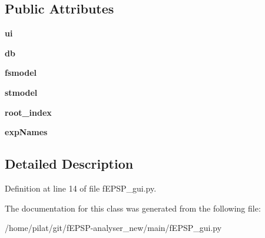\subsection*{Public Attributes}
\begin{DoxyCompactItemize}
\item 
\hypertarget{classmain_1_1f_e_p_s_p__gui_1_1_my_form_ae000576874bd1884d94977df1d4fe0fc}{{\bfseries ui}}\label{classmain_1_1f_e_p_s_p__gui_1_1_my_form_ae000576874bd1884d94977df1d4fe0fc}

\item 
\hypertarget{classmain_1_1f_e_p_s_p__gui_1_1_my_form_abbce31a8ac2252192befed1d36459394}{{\bfseries db}}\label{classmain_1_1f_e_p_s_p__gui_1_1_my_form_abbce31a8ac2252192befed1d36459394}

\item 
\hypertarget{classmain_1_1f_e_p_s_p__gui_1_1_my_form_a74b5f9410d5c3a4e49323dd1102119e3}{{\bfseries fsmodel}}\label{classmain_1_1f_e_p_s_p__gui_1_1_my_form_a74b5f9410d5c3a4e49323dd1102119e3}

\item 
\hypertarget{classmain_1_1f_e_p_s_p__gui_1_1_my_form_a642549daead2b7fe2c3838e2f4afb40d}{{\bfseries stmodel}}\label{classmain_1_1f_e_p_s_p__gui_1_1_my_form_a642549daead2b7fe2c3838e2f4afb40d}

\item 
\hypertarget{classmain_1_1f_e_p_s_p__gui_1_1_my_form_a4995db7c3a759b091ad478e3ea3e3be4}{{\bfseries root\-\_\-index}}\label{classmain_1_1f_e_p_s_p__gui_1_1_my_form_a4995db7c3a759b091ad478e3ea3e3be4}

\item 
\hypertarget{classmain_1_1f_e_p_s_p__gui_1_1_my_form_a102cc9cd40067408a2c72b7badf9bbf5}{{\bfseries exp\-Names}}\label{classmain_1_1f_e_p_s_p__gui_1_1_my_form_a102cc9cd40067408a2c72b7badf9bbf5}

\end{DoxyCompactItemize}


\subsection{Detailed Description}


Definition at line 14 of file f\-E\-P\-S\-P\-\_\-gui.\-py.



The documentation for this class was generated from the following file\-:\begin{DoxyCompactItemize}
\item 
/home/pilat/git/f\-E\-P\-S\-P-\/analyser\-\_\-new/main/f\-E\-P\-S\-P\-\_\-gui.\-py\end{DoxyCompactItemize}
